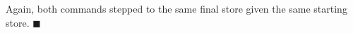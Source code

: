\documentclass[11pt]{article}
\begin{document}
\begin{exercise}
\begin{enumerate}
\footnotesize 
\begin{prooftree}
\end{prooftree}
\normalsize

Again, both commands stepped to the same final store given the same starting store.
$\blacksquare$







\end{enumerate}
\end{exercise}
\end{document}
